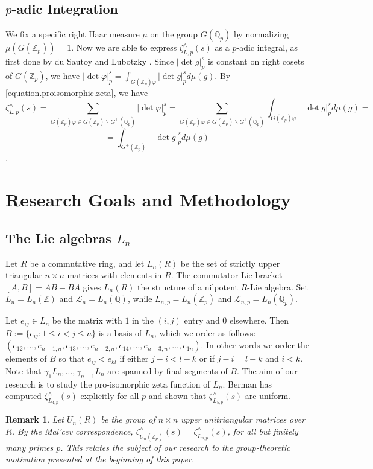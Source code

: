 \documentclass[12pt]{article}
\newtheorem{remark}[theorem]{Remark}
\begin{document}
\subsection{$p$-adic Integration}
We fix a specific right Haar measure $\mu$ on the group $G(\mathbb{Q}_{p})$ by normalizing $\mu(G(\mathbb{Z}_p))=1$. Now we are able to express $\zeta_{L,p}^{\wedge}(s)$ as a $p$-adic integral, as first done by du Sautoy and Lubotzky \cite{DuSautoyLubotzky}. Since $|\det{g}|_{p}^{s}$ is constant on right cosets of $G(\mathbb{Z}_{p})$, we have $|\det\varphi|_{p}^{s}=\displaystyle\int_{G(\mathbb{Z}_p)\varphi}{|\det{g}|_{p}^{s}}d\mu(g)$. By \eqref{equation.proisomorphic.zeta}, we have \[\zeta_{L,p}^{\wedge}(s)=\underset{\scriptscriptstyle G(\mathbb{Z}_p)\varphi\in G(\mathbb{Z}_p)\backslash{G^{+}(\mathbb{Q}_p)}}{\sum}|\det\varphi|_{p}^{s}=\underset{\scriptscriptstyle{G(\mathbb{Z}_p)}\varphi\in G(\mathbb{Z}_p)\backslash{G^{+}(\mathbb{Q}_p)}}{\sum}\displaystyle{\int_{G(\mathbb{Z}_p)\varphi}}{|\det{g}|_{p}^{s}}d\mu(g)=\]\[=\displaystyle\int_{G^{+}(\mathbb{Z}_p)}{|\det{g}|_{p}^{s}}d\mu(g)\].
\section{Research Goals and Methodology}
\subsection{The Lie algebras $L_{n}$}
Let $R$ be a commutative ring, and let $L_{n}(R)$ be the set of strictly upper triangular $n\times{n}$ matrices with elements in $R$. The commutator Lie bracket $[A,B]=AB-BA$ gives $L_{n}(R)$ the structure of a nilpotent $R$-Lie algebra. Set $L_{n}=L_{n}(\mathbb{Z})$ and $\mathcal{L}_{n}=L_{n}(\mathbb{Q})$, while $L_{n,p}=L_{n}(\mathbb{Z}_{p})$ and $\mathcal{L}_{n,p}=L_{n}(\mathbb{Q}_{p})$.

Let $e_{ij}\in{L_{n}}$ be the matrix with $1$ in the $(i,j)$ entry and $0$ elsewhere. Then $B:=\{e_{ij} : 1\leq{i}<{j}\leq{n}\}$ is a basis of $L_{n}$, which we order as follows: $(e_{12},\dots,e_{n-1,n},e_{13},\dots,e_{n-2,n},e_{14},\dots,e_{n-3,n},\dots,e_{1n})$. In other words we order the elements of $B$ so that $e_{ij}<e_{kl}$ if either $j-i<l-k$ or if $j-i=l-k$ and $i<k$. Note that $\gamma_{1}L_{n},\dots,\gamma_{n-1}L_{n}$ are spanned by final segments of $B$. The aim of our research is to study the pro-isomorphic zeta function of $L_{n}$. Berman has computed $\zeta_{L_{4,p}}^{\wedge}(s)$ explicitly for all $p$ and shown that $\zeta_{L_{5,p}}^{\wedge}(s)$ are uniform.
\begin{remark}
Let $U_n(R)$ be the group of $n\times{n}$ upper unitriangular matrices over $R$. By the Mal'cev correspondence, ${\zeta^\wedge_{U_{n}(\mathbb{Z}_{p})}}(s)={\zeta^\wedge_{L_{n,p}}}(s)$, for all but finitely many primes $p$. This relates the subject of our research to the group-theoretic motivation presented at the beginning of this paper.
\end{remark}
\end{document}
